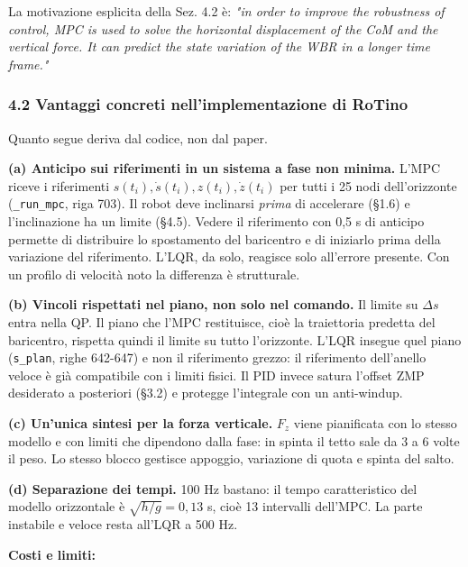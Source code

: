 \documentclass[
]{article}
\begin{document}
La motivazione esplicita della Sez. 4.2 è: \emph{"in order to improve the robustness of control, MPC is used to solve the horizontal displacement of the CoM and the vertical force. It can predict the state variation of the WBR in a longer time frame."}

\subsubsection{4.2 Vantaggi concreti nell'implementazione di RoTino}\label{42-vantaggi-concreti-nellimplementazione-di-rotino}

Quanto segue deriva dal codice, non dal paper.

\textbf{(a) Anticipo sui riferimenti in un sistema a fase non minima.} L'MPC riceve i riferimenti \(s(t_i), \dot s(t_i), z(t_i), \dot z(t_i)\) per tutti i 25 nodi dell'orizzonte (\texttt{\_run\_mpc}, riga 703). Il robot deve inclinarsi \emph{prima} di accelerare (§1.6) e l'inclinazione ha un limite (§4.5). Vedere il riferimento con 0,5 s di anticipo permette di distribuire lo spostamento del baricentro e di iniziarlo prima della variazione del riferimento. L'LQR, da solo, reagisce solo all'errore presente. Con un profilo di velocità noto la differenza è strutturale.

\textbf{(b) Vincoli rispettati nel piano, non solo nel comando.} Il limite su \(\Delta s\) entra nella QP. Il piano che l'MPC restituisce, cioè la traiettoria predetta del baricentro, rispetta quindi il limite su tutto l'orizzonte. L'LQR insegue quel piano (\texttt{s\_plan}, righe 642-647) e non il riferimento grezzo: il riferimento dell'anello veloce è già compatibile con i limiti fisici. Il PID invece satura l'offset ZMP desiderato a posteriori (§3.2) e protegge l'integrale con un anti-windup.

\textbf{(c) Un'unica sintesi per la forza verticale.} \(F_z\) viene pianificata con lo stesso modello e con limiti che dipendono dalla fase: in spinta il tetto sale da 3 a 6 volte il peso. Lo stesso blocco gestisce appoggio, variazione di quota e spinta del salto.

\textbf{(d) Separazione dei tempi.} 100 Hz bastano: il tempo caratteristico del modello orizzontale è \(\sqrt{h/g} = 0{,}13\) s, cioè 13 intervalli dell'MPC. La parte instabile e veloce resta all'LQR a 500 Hz.

\textbf{Costi e limiti:}
\end{document}
